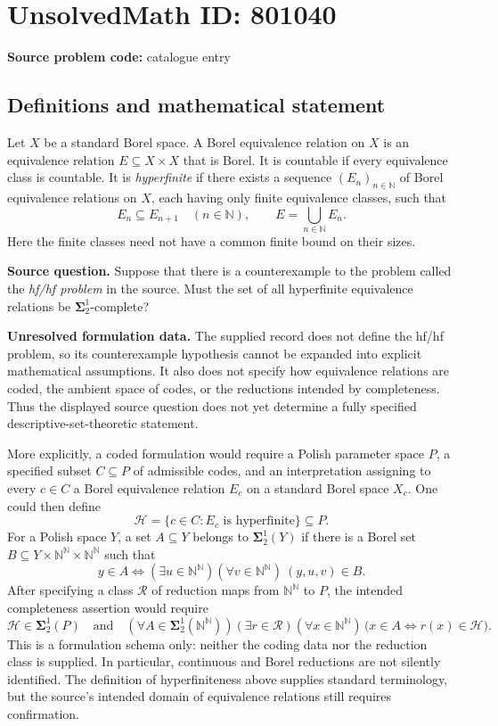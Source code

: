 \documentclass[11pt]{article}
\newcommand{\N}{\mathbb{N}}
\begin{document}
\section*{UnsolvedMath ID: 801040}
\textbf{Source problem code:} catalogue entry
\subsection{Definitions and mathematical statement}
Let \(X\) be a standard Borel space. A Borel equivalence relation on \(X\) is an equivalence relation \(E\subseteq X\times X\) that is Borel. It is countable if every equivalence class is countable. It is \emph{hyperfinite} if there exists a sequence \((E_n)_{n\in\N}\) of Borel equivalence relations on \(X\), each having only finite equivalence classes, such that
\[
E_n\subseteq E_{n+1}\quad(n\in\N),\qquad E=\bigcup_{n\in\N}E_n.
\]
Here the finite classes need not have a common finite bound on their sizes.

\textbf{Source question.} Suppose that there is a counterexample to the problem called the \emph{hf/hf problem} in the source. Must the set of all hyperfinite equivalence relations be \(\boldsymbol{\Sigma}^{1}_{2}\)-complete?

\textbf{Unresolved formulation data.} The supplied record does not define the hf/hf problem, so its counterexample hypothesis cannot be expanded into explicit mathematical assumptions. It also does not specify how equivalence relations are coded, the ambient space of codes, or the reductions intended by completeness. Thus the displayed source question does not yet determine a fully specified descriptive-set-theoretic statement.

More explicitly, a coded formulation would require a Polish parameter space \(P\), a specified subset \(C\subseteq P\) of admissible codes, and an interpretation assigning to every \(c\in C\) a Borel equivalence relation \(E_c\) on a standard Borel space \(X_c\). One could then define
\[
\mathcal H=\{c\in C:E_c\text{ is hyperfinite}\}\subseteq P.
\]
For a Polish space \(Y\), a set \(A\subseteq Y\) belongs to \(\boldsymbol{\Sigma}^{1}_{2}(Y)\) if there is a Borel set \(B\subseteq Y\times\N^{\N}\times\N^{\N}\) such that
\[
y\in A\iff (\exists u\in\N^{\N})(\forall v\in\N^{\N})\ (y,u,v)\in B.
\]
After specifying a class \(\mathscr R\) of reduction maps from \(\N^{\N}\) to \(P\), the intended completeness assertion would require
\[
\mathcal H\in\boldsymbol{\Sigma}^{1}_{2}(P)
\quad\text{and}\quad
(\forall A\in\boldsymbol{\Sigma}^{1}_{2}(\N^{\N}))
(\exists r\in\mathscr R)(\forall x\in\N^{\N})\,
\bigl(x\in A\iff r(x)\in\mathcal H\bigr).
\]
This is a formulation schema only: neither the coding data nor the reduction class is supplied. In particular, continuous and Borel reductions are not silently identified. The definition of hyperfiniteness above supplies standard terminology, but the source's intended domain of equivalence relations still requires confirmation.
\end{document}
